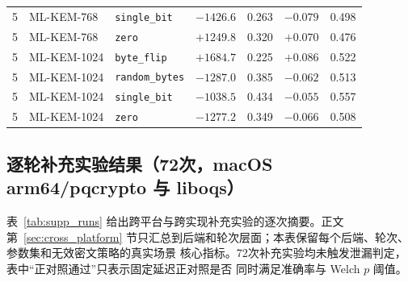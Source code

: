\documentclass[a4paper,fontset=none]{ctexart}
\begin{document}
\begin{longtable}[c]{c>{\raggedright}p{2.2cm}>{\raggedright}p{2.6cm}rrrr}
  5 & ML-KEM-768  & \texttt{single\_bit}   & $-1426.6$  & 0.263 & $-0.079$ & 0.498 \\
  5 & ML-KEM-768  & \texttt{zero}          & $+1249.8$  & 0.320 & $+0.070$ & 0.476 \\
  5 & ML-KEM-1024 & \texttt{byte\_flip}    & $+1684.7$  & 0.225 & $+0.086$ & 0.522 \\
  5 & ML-KEM-1024 & \texttt{random\_bytes} & $-1287.0$  & 0.385 & $-0.062$ & 0.513 \\
  5 & ML-KEM-1024 & \texttt{single\_bit}   & $-1038.5$  & 0.434 & $-0.055$ & 0.557 \\
  5 & ML-KEM-1024 & \texttt{zero}          & $-1277.2$  & 0.349 & $-0.066$ & 0.508 \\
\end{longtable}

\normalsize
\subsection*{逐轮补充实验结果（72次，macOS arm64/pqcrypto 与 liboqs）}

表~\ref{tab:supp_runs} 给出跨平台与跨实现补充实验的逐次摘要。正文第~\ref{sec:cross_platform}
节只汇总到后端和轮次层面；本表保留每个后端、轮次、参数集和无效密文策略的真实场景
核心指标。72次补充实验均未触发泄漏判定，表中``正对照通过''只表示固定延迟正对照是否
同时满足准确率与 Welch $p$ 阈值。
\end{document}
